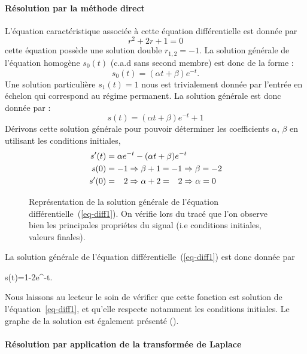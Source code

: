 \paragraph{Résolution par la méthode direct}
L'équation caractéristique associée à cette équation différentielle est 
donnée par 
$$
r^2+2r+1=0
$$
cette équation possède une solution double $r_{1,2}=-1$.
La solution générale de l'équation homogène $s_0(t)$ (c.a.d sans second membre) 
est donc de la forme :
$$
s_0(t)=(\alpha t+\beta)e^{-t}.
$$
Une solution particulière $s_1(t)=1$ nous est trivialement donnée par l'entrée 
en échelon qui correspond au régime permanent.
La solution générale est donc donnée par :
$$
s(t)=(\alpha t+\beta)e^{-t}+1
$$
Dérivons cette solution générale pour pouvoir déterminer les coefficients 
$\alpha$, $\beta$ en utilisant les conditions initiales,
\begin{align*}
    s'(t)&=\alpha e^{-t}-(\alpha t+\beta)e^{-t}\\
     s(0)&=-1\Rightarrow\beta+1=-1\Rightarrow\beta=-2 \\
    s'(0)&=\hphantom{-}2\Rightarrow\alpha+2=\hphantom{-}2\Rightarrow\alpha=0
\end{align*}

\begin{figure}[!t]
    \centering
    
    \caption{Représentation de la solution générale de l'équation 
             différentielle~(\ref{eq-diff1}). On vérifie lors du tracé que 
             l'on observe bien les principales propriétes du signal 
             (i.e conditions initiales, valeurs finales).\label{fig-solution}}
\end{figure}

La solution générale de l'équation différentielle~(\ref{eq-diff1}) est 
donc donnée par 
\begin{bequation}
s(t)=1-2e^{-t}.
\end{bequation}
Nous laissons au lecteur le soin de vérifier que cette fonction est solution 
de l'équation~\ref{eq-diff1}, et qu'elle respecte notamment les conditions 
initiales. Le graphe de la solution est également présenté 
().

\paragraph{Résolution par application de la transformée de Laplace}

